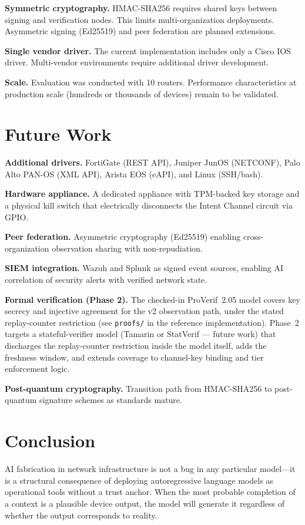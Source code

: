 \documentclass[11pt,twocolumn]{article}
\begin{document}
\textbf{Symmetric cryptography.} HMAC-SHA256 requires shared keys between signing and verification nodes. This limits multi-organization deployments. Asymmetric signing (Ed25519) and peer federation are planned extensions.

\textbf{Single vendor driver.} The current implementation includes only a Cisco IOS driver. Multi-vendor environments require additional driver development.

\textbf{Scale.} Evaluation was conducted with 10 routers. Performance characteristics at production scale (hundreds or thousands of devices) remain to be validated.

\section{Future Work}

\textbf{Additional drivers.} FortiGate (REST API), Juniper JunOS (NETCONF), Palo Alto PAN-OS (XML API), Arista EOS (eAPI), and Linux (SSH/bash).

\textbf{Hardware appliance.} A dedicated appliance with TPM-backed key storage and a physical kill switch that electrically disconnects the Intent Channel circuit via GPIO.

\textbf{Peer federation.} Asymmetric cryptography (Ed25519) enabling cross-organization observation sharing with non-repudiation.

\textbf{SIEM integration.} Wazuh and Splunk as signed event sources, enabling AI correlation of security alerts with verified network state.

\textbf{Formal verification (Phase 2).} The checked-in ProVerif~2.05 model covers key secrecy and injective agreement for the v2 observation path, under the stated replay-counter restriction (see \texttt{proofs/} in the reference implementation). Phase~2 targets a stateful-verifier model (Tamarin or StatVerif — future work) that discharges the replay-counter restriction inside the model itself, adds the freshness window, and extends coverage to channel-key binding and tier enforcement logic.

\textbf{Post-quantum cryptography.} Transition path from HMAC-SHA256 to post-quantum signature schemes as standards mature.

\section{Conclusion}

AI fabrication in network infrastructure is not a bug in any particular model---it is a structural consequence of deploying autoregressive language models as operational tools without a trust anchor. When the most probable completion of a context is a plausible device output, the model will generate it regardless of whether the output corresponds to reality.
\end{document}
